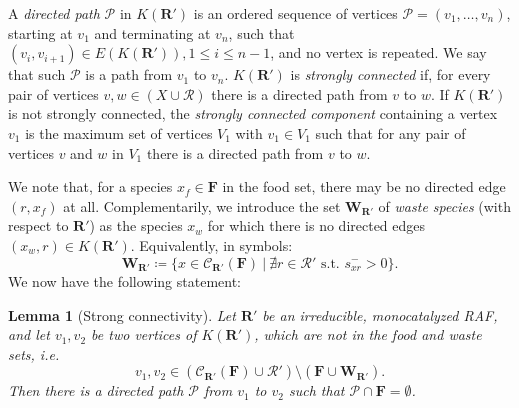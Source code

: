 \documentclass[pdflatex]{sn-jnl}
\theoremstyle{thmstyleone}%
\newtheorem{lemma}[theorem]{Lemma}%
\theoremstyle{examplesty}%
\theoremstyle{thmstylethree}%
\newcommand{\king}{K}
\newcommand{\food}{\ensuremath{\mathbf{F}}}
\newcommand{\closure}[2]{\mathscr{C}_{#1}(#2)}
\newcommand{\CR}[0]{\mathcal{R}}
\newcommand{\RAF}[0]{\mathbf{R}'}
\begin{document}
A \emph{directed path} $\mathcal{P}$ in $K(\RAF)$ is an ordered sequence of
vertices $\mathcal{P}=(v_1,\ldots, v_n)$, starting at $v_1$ and terminating
at $v_n$, such that $(v_i,v_{i+1})\in E(\king(\RAF)), 1\leq i\leq n-1$, and
no vertex is repeated. We say that such $\mathcal{P}$ is a path from $v_1$
to $v_n$.  $\king(\RAF)$ is \emph{strongly connected} if, for every pair of
vertices $v,w\in (X\cup\mathcal{R})$ there is a directed path from $v$ to
$w$. If $\king(\RAF)$ is not strongly connected, the \emph{strongly
  connected component} containing a vertex $v_1$ is the maximum set of
vertices $V_1$ with $v_1\in V_1$ such that for any pair of vertices $v$ and
$w$ in $V_1$ there is a directed path from $v$ to $w$.

We note that, for a species $x_f \in \food$ in the food set, there may be
no directed edge $(r,x_f)$ at all.  Complementarily, we introduce the set
$\mathbf{W}_{\RAF}$ of \emph{waste species} (with respect to $\RAF$) as the
species $x_w$ for which there is no directed edges $(x_w,r)\in
\king(\RAF)$. Equivalently, in symbols:
\begin{equation}\label{eq:Waste}
  \mathbf{W}_{\RAF}\coloneqq \{x\in \closure{\RAF}{\food} \ | \
  \nexists r \in \CR' \text{ s.t. } s^-_{xr}>0\}.
\end{equation}
We now have the following statement:
\vspace{6pt}
\begin{lemma}[Strong connectivity]\label{lem:PSC}
  Let $\RAF$ be an irreducible, monocatalyzed RAF, and let $v_1,v_2$ be two
  vertices of $\king(\RAF)$, which are not in the food and waste sets, i.e.
  \begin{equation}
    v_1,v_2\in (\closure{\RAF}{\food} \cup \mathcal{R}') \setminus
    (\food \cup\mathbf{W}_{\RAF}).
  \end{equation} 
  Then there is a directed path $\mathcal{P}$ from $v_1$ to $v_2$ such that
  $\mathcal{P}\cap \food =\emptyset$.
\end{lemma}
\end{document}
